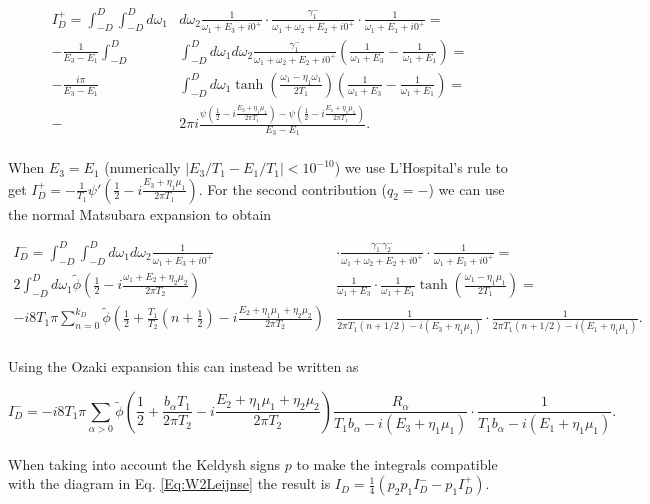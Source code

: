 \documentclass{article}
\begin{document}
\begin{equation}
\begin{split}
   I_D^+ =\int_{-D}^D\int_{-D}^Dd\omega_1&d\omega_2  \frac{1}{\omega_1+E_3+ i0^+}\cdot\frac{\gamma^{-}_1}{\omega_1 + \omega_2 + E_2 + i0^+}\cdot\frac{1}{\omega_1+E_1+i0^+} = \\ 
   - \frac{1}{E_3-E_1}\int_{-D}^D&\int_{-D}^Dd\omega_1d\omega_2\frac{\gamma^-_1}{\omega_1 + \omega_2 + E_2 + i0^+}\left( \frac{1}{\omega_1+E_3} -\frac{1}{\omega_1 + E_1} \right ) = \\ 
   -\frac{i\pi}{E_3-E_1}&\int_{-D}^D d\omega_1\tanh\left( \frac{\omega_1-\eta_1\omega_1}{2T_1}\right )\left ( \frac{1}{\omega_1+E_3}- \frac{1}{\omega_1+E_1}\right ) = \\
    -&2\pi i \frac{\psi\left(\frac{1}{2}-i\frac{E_3+\eta_1\mu_1}{2\pi T_1}\right)-\psi\left(\frac{1}{2}-i\frac{E_1+\eta_1\mu_1}{2\pi T_1}\right)}{E_3-E_1}.
    \end{split}
\end{equation}
\\
When $E_3=E_1$ (numerically $|E_3/T_1-E_1/T_1|<10^{-10}$) we use L'Hospital's rule to get $I_D^+=-\frac{1}{T_1}\psi'\left( \frac{1}{2}-i\frac{E_3+\eta_1\mu_1}{2\pi T_1} \right)$. For the second contribution ($q_2=-$) we can use the normal Matsubara expansion to obtain

\begin{equation}
\begin{split}
    I_D^- = \int_{-D}^D\int_{-D}^Dd\omega_1d\omega_2 \frac{1}{\omega_1+E_3+ i0^+}&\cdot\frac{\gamma^{-}_1\gamma^{-}_2}{\omega_1 + \omega_2 + E_2 + i0^+}\cdot\frac{1}{\omega_1+E_1+i0^+} = \\ 
    2\int_{-D}^Dd\omega_1\tilde{\phi}\left( \frac{1}{2}-i\frac{\omega_1+E_2+\eta_2\mu_2}{2\pi T_2}\right)&\frac{1}{\omega_1+E_3}\cdot\frac{1}{\omega_1 + E_1}\tanh\left ( \frac{\omega_1-\eta_1\mu_1}{2T_1}\right ) = \\ 
    -i8 T_1\pi \sum_{n=0}^{k_D}\tilde{\phi}\left ( \frac{1}{2} + \frac{T_1}{T_2}\left(n + \frac{1}{2} \right )-i\frac{E_2 + \eta_1\mu_1 + \eta_2\mu_2}{2\pi T_2} \right )&\frac{1}{2\pi T_1(n + 1/2)-i(E_3+\eta_1\mu_1)}\cdot\frac{1}{2\pi T_1(n+1/2)-i(E_1+\eta_1\mu_1)}.
\end{split}
\end{equation}
\\
Using the Ozaki expansion this can instead be written as 

\begin{equation}
    I_D^- = -i8T_1\pi \sum_{\alpha>0}\tilde{\phi}\left ( \frac{1}{2}+\frac{b_\alpha T_1}{2\pi T_2} -i\frac{E_2+\eta_1\mu_1+\eta_2\mu_2}{2\pi T_2} \right )\frac{R_\alpha}{T_1b_\alpha-i(E_3+\eta_1\mu_1)}\cdot\frac{1}{T_1b_\alpha-i(E_1+\eta_1\mu_1)}.
\end{equation}
\\
When taking into account the Keldysh signs $p$ to make the integrals compatible with the diagram in Eq. \ref{Eq:W2Leijnse} the result is $I_D = \frac{1}{4}(p_2p_1I_D^--p_1I_D^+)$.
\end{document}
